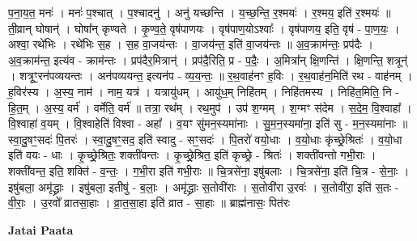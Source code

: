 \documentclass[17pt]{extarticle}
\begin{document}
प॒ना॒य॒त॒ मनः॑ । मनः॑ प॒श्चात् । प॒श्चादनु॑ । अनु॑ यच्छन्ति । य॒च्छ॒न्ति॒ र॒श्मयः॑ । र॒श्मय॒ इति॑ र॒श्मयः॑ ॥ ती॒व्रान् घोषान्॑ । घोषा᳚न् कृण्वते । कृ॒ण्व॒ते॒ वृष॑पाणयः । वृष॑पाण॒योऽश्वाः᳚ । वृष॑पाणय॒ इति॒ वृष॑ - पा॒ण॒यः॒ । अश्वा॒ रथे॑भिः । रथे॑भिः स॒ह । स॒ह वा॒जय॑न्तः । वा॒जय॑न्त॒ इति॑ वा॒जय॑न्तः ॥ अ॒व॒क्राम॑न्तः॒ प्रप॑दैः । अ॒व॒क्राम॑न्त॒ इत्य॑व - क्राम॑न्तः । प्रप॑दैर॒मित्रान्॑ । प्रप॑दै॒रिति॒ प्र - प॒दैः॒ । अ॒मित्रा᳚न् क्षि॒णन्ति॑ । क्षि॒णन्ति॒ शत्रून्॑ । शत्रूꣳ॒॒रन॑पव्ययन्तः । अन॑पव्ययन्त॒ इत्यन॑प - व्य॒य॒न्तः॒ ॥ र॒थ॒वाह॑नꣳ ह॒विः । र॒थ॒वाह॑न॒मिति॑ रथ - वाह॑नम् । ह॒विर॑स्य । अ॒स्य॒ नाम॑ । नाम॒ यत्र॑ । यत्रायु॑धम् । आयु॑ध॒म् निहि॑तम् । निहि॑तमस्य । निहि॑त॒मिति॒ नि - हि॒त॒म् । अ॒स्य॒ वर्म॑ । वर्मेति॒ वर्म॑ ॥ तत्रा॒ रथ᳚म् । रथ॒मुप॑ । उप॑ श॒ग्मम् । श॒ग्मꣳ स॑देम । स॒दे॒म॒ वि॒श्वाहा᳚ । वि॒श्वाहा॑ व॒यम् । वि॒श्वाहेति॑ विश्वा - अहा᳚ । व॒यꣳ सु॑मन॒स्यमा॑नाः । सु॒म॒न॒स्यमा॑ना॒ इति॑ सु - म॒न॒स्यमा॑नाः ॥ स्वा॒दु॒षꣳ॒॒सदः॑ पि॒तरः॑ । स्वा॒दु॒षꣳ॒॒सद॒ इति॑ स्वादु - सꣳ॒॒सदः॑ । पि॒तरो॑ वयो॒धाः । व॒यो॒धाः कृ॑च्छ्रे॒श्रितः॑ । व॒यो॒धा इति॑ वयः - धाः । कृ॒च्छ्रे॒श्रितः॒ शक्ती॑वन्तः । कृ॒च्छ्रे॒श्रित॒ इति॑ कृच्छ्रे - श्रितः॑ । शक्ती॑वन्तो गभी॒राः । शक्ती॑वन्त॒ इति॒ शक्ति॑ - व॒न्तः॒ । ग॒भी॒रा इति॑ गभी॒राः ॥ चि॒त्रसे॑ना॒ इषु॑बलाः । चि॒त्रसे॑ना॒ इति॑ चि॒त्र - से॒नाः॒ । इषु॑बला॒ अमृ॑द्ध्राः । इषु॑बला॒ इतीषु॑ - ब॒लाः॒ । अमृ॑द्ध्राः स॒तोवी॑राः । स॒तोवी॑रा उ॒रवः॑ । स॒तोवी॑रा॒ इति॑ स॒तः - वी॒राः॒ । उ॒रवो᳚ व्रातसा॒हाः । व्रा॒त॒सा॒हा इति॑ व्रात - सा॒हाः ॥ ब्राह्म॑नासः॒ पित॑रः \newline

\textbf{Jatai Paata} \newline
\end{document}
